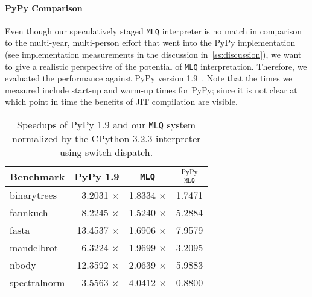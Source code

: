 \documentclass[preprint,10pt]{popl14conf}
\newcommand{\mlq}{\texttt{MLQ}}
\begin{document}
\paragraph{PyPy Comparison}
Even though our speculatively staged \mlq{} interpreter is no match in comparison to the multi-year,
multi-person effort that went into the PyPy implementation (see implementation measurements in the
discussion in~\autoref{ss:discussion}), we want to give a realistic perspective of the potential of
\mlq{} interpretation.
Therefore, we evaluated the performance against PyPy version 1.9~\cite{pypy+13}.
Note that the times we measured include start-up and warm-up times for PyPy; since it is not clear
at which point in time the benefits of JIT compilation are visible.

\begin{table}[t!]
  \centering
  \begin{tabular}{|l|r|r|r|}
    \hline
    \multicolumn{1}{|c|}{Benchmark} & \multicolumn{1}{c|}{PyPy 1.9} & \multicolumn{1}{c|}{\mlq{}} & \multicolumn{1}{c|}{$\frac{\mathrm{PyPy}}{\mlq{}}$} \\
    \hline
    \hline
    \textsf{binarytrees}            & 3.2031 $\times$               & 1.8334 $\times$                   & 1.7471 \\
    \hline
    \textsf{fannkuch}               & 8.2245 $\times$               & 1.5240 $\times$                   & 5.2884 \\
    \hline
    \textsf{fasta}                  & 13.4537 $\times$              & 1.6906 $\times$                   & 7.9579 \\
    \hline
    \textsf{mandelbrot}             & 6.3224 $\times$               & 1.9699 $\times$                   & 3.2095 \\
    \hline
    \textsf{nbody}                  & 12.3592 $\times$              & 2.0639 $\times$                   & 5.9883 \\
    \hline
    \textsf{spectralnorm}           & 3.5563 $\times$               & 4.0412 $\times$                   & 0.8800 \\
    \hline
  \end{tabular}
  \caption{Speedups of PyPy 1.9 and our \mlq{} system normalized by the CPython 3.2.3 interpreter using switch-dispatch.\label{tab:pypy-speedups}}
\end{table}
\end{document}
